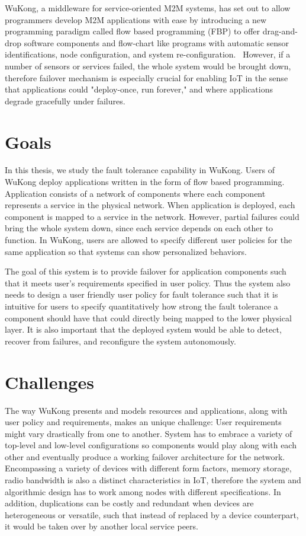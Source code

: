 WuKong, a middleware for service-oriented M2M systems, has set out to allow
programmers develop M2M applications with ease by introducing a new
programming paradigm called flow based programming (FBP) to offer drag-and-drop
software components and flow-chart like programs with automatic sensor
identifications, node configuration, and system re-configuration.~\cite{Reijers}
However, if a number of sensors or services failed, the whole system would be
brought down, therefore failover mechanism is especially crucial for enabling
IoT in the sense that applications could "deploy-once, run forever," and where
applications degrade gracefully under failures.


\section{Goals} %

In this thesis, we study the fault tolerance capability in WuKong.
Users of WuKong deploy applications written in the form of flow based
programming. Application consists of a network of components where each
component represents a service in the physical network. When application is deployed, each
component is mapped to a service in the network. However, partial failures could
bring the whole system down, since each service depends on each other to
function. In WuKong, users are allowed to specify different user policies for
the same application so that systems can show personalized behaviors. 

The goal of this system is to provide failover for application components such
that it meets user's requirements specified in user policy. Thus the system also
needs to design a user friendly user policy for fault tolerance such that it is
intuitive for users to specify quantitatively how strong the fault tolerance
a component should have that could directly being mapped to the lower physical
layer. It is also important that the deployed system would be
able to detect, recover from failures, and reconfigure the system autonomously. 


\section{Challenges}

The way WuKong presents and models resources and applications, along with user
policy and requirements, makes an unique challenge: User requirements might
vary drastically from one to another. System has to embrace a variety of
top-level and low-level configurations so components would play along with each
other and eventually produce a working failover architecture for the network.
Encompassing a variety of devices with different form factors, memory storage,
radio bandwidth is also a distinct characteristics in IoT,
therefore the system and algorithmic design has to work among nodes
with different specifications. In addition, duplications can be
costly and redundant when devices are heterogeneous or versatile,
such that instead of replaced by a device counterpart, it would be
taken over by another local service peers.

